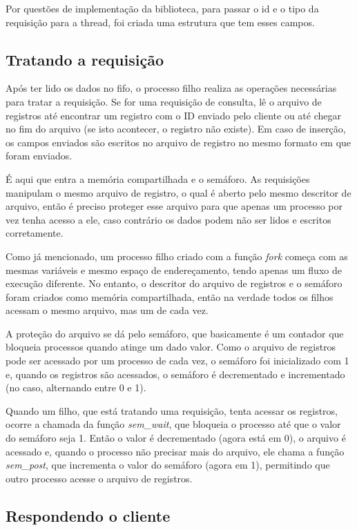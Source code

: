 \documentclass[12pt]{article}
\begin{document}
Por questões de implementação da biblioteca, para passar o id e o tipo da requisição para a thread, foi criada uma estrutura que tem esses campos.

\subsection{Tratando a requisição}

Após ter lido os dados no fifo, o processo filho realiza as operações necessárias para tratar a requisição. Se for uma requisição de consulta, lê o arquivo de registros até encontrar um registro com o ID enviado pelo cliente ou até chegar no fim do arquivo (se isto acontecer, o registro não existe). Em caso de inserção, os campos enviados são escritos no arquivo de registro no mesmo formato em que foram enviados.

É aqui que entra a memória compartilhada e o semáforo. As requisições manipulam o mesmo arquivo de registro, o qual é aberto pelo mesmo descritor de arquivo, então é preciso proteger esse arquivo para que apenas um processo por vez tenha acesso a ele, caso contrário os dados podem não ser lidos e escritos corretamente.

Como já mencionado, um processo filho criado com a função \emph{fork} começa com as mesmas variáveis e mesmo espaço de endereçamento, tendo apenas um fluxo de execução diferente. No entanto, o descritor do arquivo de registros e o semáforo foram criados como memória compartilhada, então na verdade todos os filhos acessam o mesmo arquivo, mas um de cada vez.

A proteção do arquivo se dá pelo semáforo, que basicamente é um contador que bloqueia processos quando atinge um dado valor. Como o arquivo de registros pode ser acessado por um processo de cada vez, o semáforo foi inicializado com 1 e, quando os registros são acessados, o semáforo é decrementado e incrementado (no caso, alternando entre 0 e 1).

Quando um filho, que está tratando uma requisição, tenta acessar os registros, ocorre a chamada da função \emph{sem\_wait}, que bloqueia o processo até que o valor do semáforo seja 1. Então o valor é decrementado (agora está em 0), o arquivo é acessado e, quando o processo não precisar mais do arquivo, ele chama a função \emph{sem\_post}, que incrementa o valor do semáforo (agora em 1), permitindo que outro processo acesse o arquivo de registros.

\subsection{Respondendo o cliente}
\end{document}
